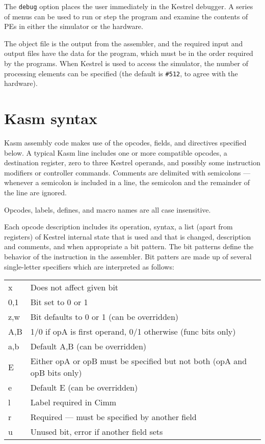 The {\tt debug} option places the user immediately in the Kestrel
debugger.  A series of menus can be used to run or step the program
and examine the contents of PEs in either the simulator or the
hardware.

The object file is the output from the assembler, and the required
input and output files have the data for the program, which must be in
the order required by the programs.  When {\sc Kestrel} is used to
access the simulator, the number of processing elements can be
specified  (the default is \verb+#512+, to agree with the hardware).

\section{Kasm syntax}

{\sc Kasm\/} assembly code makes use of the opcodes, fields, and
directives specified below.  A typical {\sc Kasm\/} line includes one
or more compatible opcodes, a destination register, zero to three
Kestrel operands, and possibly some instruction modifiers or
controller commands.  Comments are delimited with semicolons ---
whenever a semicolon is included in a line, the semicolon and the
remainder of the line are ignored.

Opcodes, labels, defines, and macro names are all case insensitive.

Each opcode description includes its operation, syntax, a list (apart
from registers) of Kestrel internal state that is used and that is
changed,  description and comments, and when appropriate a bit
pattern.  The bit patterns define the behavior of the instruction in
the assembler.  Bit patters are made up of several single-letter
specifiers which are interpreted as follows:

\begin{center}
\begin{tabular}{ll}
 x    &Does not affect given bit\\
 0,1  &Bit set to 0 or 1\\
 z,w  &Bit defaults to 0 or 1 (can be overridden)\\
 A,B  &1/0 if opA is first operand, 0/1 otherwise (func bits only)\\
 a,b  &Default A,B (can be overridden)\\
 E    &Either opA or opB must be specified but not both (opA and opB
 bits only)\\
 e    &Default E (can be overridden)\\
 l    &Label required in Cimm\\
 r    &Required --- must be specified by another field\\
 u    &Unused bit, error if another field sets
\end{tabular}
\end{center}

